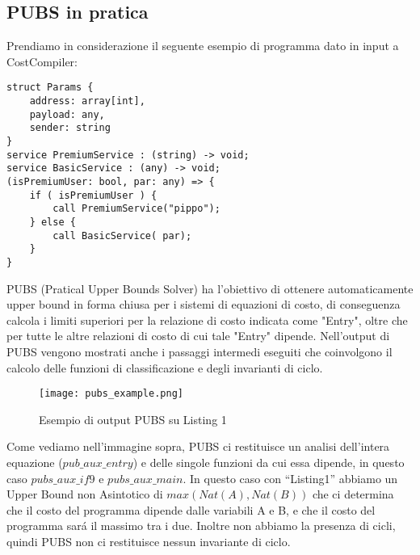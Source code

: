 \documentclass[../../main.tex]{subfiles}
\begin{document}
\subsection{PUBS in pratica}
Prendiamo in considerazione il seguente esempio di programma dato in input a CostCompiler:
\begin{lstlisting}[caption={Listing 1}]
struct Params {
	address: array[int],
	payload: any,
	sender: string
}
service PremiumService : (string) -> void;
service BasicService : (any) -> void;
(isPremiumUser: bool, par: any) => {
	if ( isPremiumUser ) {
		call PremiumService("pippo");
	} else {
		call BasicService( par);
	}
}
\end{lstlisting}

PUBS (Pratical Upper Bounds Solver) ha l'obiettivo di ottenere automaticamente upper bound in forma chiusa per i sistemi di equazioni di costo, di conseguenza calcola i limiti superiori per la relazione di costo indicata come "Entry", oltre che per tutte le altre relazioni di costo di cui tale "Entry" dipende.
Nell'output di PUBS vengono mostrati anche i passaggi intermedi eseguiti che coinvolgono il calcolo delle funzioni di classificazione e degli invarianti di ciclo.

\begin{figure}[H]
    \centering
    \texttt{[image: pubs\_example.png]}
    \caption{Esempio di output PUBS su Listing 1}
\end{figure}
Come vediamo nell'immagine sopra, PUBS ci restituisce un analisi dell'intera equazione ($pub\_aux\_entry$) e delle singole funzioni da cui essa dipende, in questo caso $pubs\_aux\_if9$ e $pubs\_aux\_main$.
In questo caso con ``Listing1'' abbiamo un Upper Bound non Asintotico di $max(Nat(A), Nat(B))$ che ci determina che il costo del programma dipende dalle variabili A e B, e che il costo del programma sará il massimo tra i due.
Inoltre non abbiamo la presenza di cicli, quindi PUBS non ci restituisce nessun invariante di ciclo.
\end{document}
